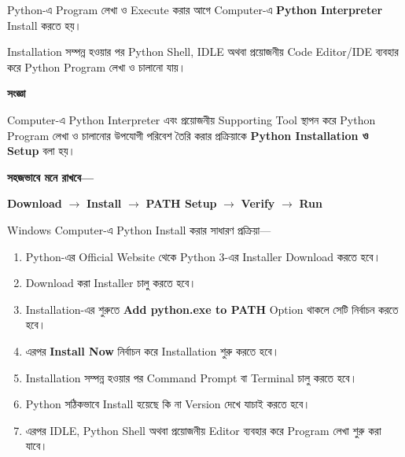 
Python-এ Program লেখা ও Execute করার আগে Computer-এ
\textbf{Python Interpreter} Install করতে হয়।

Installation সম্পন্ন হওয়ার পর Python Shell, IDLE অথবা
প্রয়োজনীয় Code Editor/IDE ব্যবহার করে Python Program
লেখা ও চালানো যায়।



\begin{definitionbox}

\textbf{\color{darkTeal}সংজ্ঞা}

Computer-এ Python Interpreter এবং প্রয়োজনীয় Supporting Tool
স্থাপন করে Python Program লেখা ও চালানোর উপযোগী পরিবেশ
তৈরি করার প্রক্রিয়াকে \textbf{Python Installation ও Setup} বলা হয়।

\end{definitionbox}

\textbf{সহজভাবে মনে রাখবে—}

\begin{center}

\textbf{Download}
\(\longrightarrow\)
\textbf{Install}
\(\longrightarrow\)
\textbf{PATH Setup}
\(\longrightarrow\)
\textbf{Verify}
\(\longrightarrow\)
\textbf{Run}

\end{center}



Windows Computer-এ Python Install করার সাধারণ প্রক্রিয়া—

\begin{enumerate}

\item
Python-এর Official Website থেকে Python 3-এর Installer
Download করতে হবে।

\item
Download করা Installer চালু করতে হবে।

\item
Installation-এর শুরুতে
\textbf{Add python.exe to PATH}
Option থাকলে সেটি নির্বাচন করতে হবে।

\item
এরপর \textbf{Install Now} নির্বাচন করে Installation শুরু করতে হবে।

\item
Installation সম্পন্ন হওয়ার পর Command Prompt বা Terminal
চালু করতে হবে।

\item
Python সঠিকভাবে Install হয়েছে কি না Version দেখে যাচাই করতে হবে।

\item
এরপর IDLE, Python Shell অথবা প্রয়োজনীয় Editor ব্যবহার করে
Program লেখা শুরু করা যাবে।

\end{enumerate}

